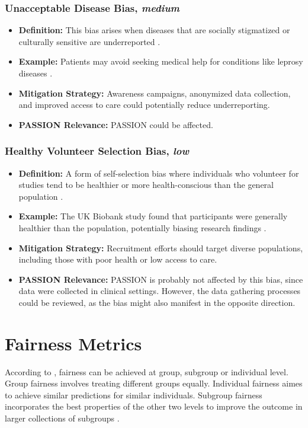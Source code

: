 \documentclass[12pt, a4paper, oneside]{book}   	%
\begin{document}
\begin{appendices}
		\subsection{Unacceptable Disease Bias, \textit{medium}}
		\begin{itemize}
			\item \textbf{Definition:} This bias arises when diseases that are socially stigmatized or culturally sensitive are underreported \autocite{Chakraborty_2024}.
			\item \textbf{Example:} Patients may avoid seeking medical help for conditions like leprosy diseases \autocite{Chakraborty_2024}.
			\item \textbf{Mitigation Strategy:} Awareness campaigns, anonymized data collection, and improved access to care could potentially reduce underreporting.
			\item \textbf{PASSION Relevance:} PASSION could be affected.
		\end{itemize}
		
		\subsection{Healthy Volunteer Selection Bias, \textit{low}}
		\begin{itemize}
			\item \textbf{Definition:} A form of self-selection bias where individuals who volunteer for studies tend to be healthier or more health-conscious than the general population \autocite{Delgado-Rodriguez_2004, Mehrabi_2021}.
			\item \textbf{Example:} The UK Biobank study found that participants were generally healthier than the population, potentially biasing research findings \autocite{Mehrabi_2021}.
			\item \textbf{Mitigation Strategy:} Recruitment efforts should target diverse populations, including those with poor health or low access to care.
			\item \textbf{PASSION Relevance:} PASSION is probably not affected by this bias, since data were collected in clinical settings. However, the data gathering processes could be reviewed, as the bias might also manifest in the opposite direction.
		\end{itemize}
			
			\chapter{Fairness Metrics}\label{app:fairnessMetrics}
			According to \textcite{Mehrabi_2021}, fairness can be achieved at group, subgroup or individual level. Group fairness involves treating different groups equally. Individual fairness aimes to achieve similar predictions for similar individuals. Subgroup fairness incorporates the best properties of the other two levels to improve the outcome in larger collections of subgroups \autocite{Mehrabi_2021}. 
			 

\end{appendices}
\end{document}
